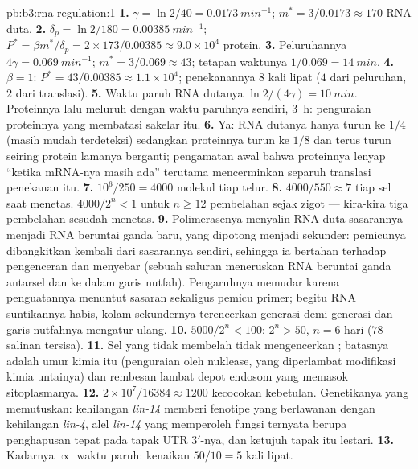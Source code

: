 \begin{solution}{pb:b3:rna-regulation:1}
\textbf{1.} $\gamma = \ln 2/40 = \qty{0.0173}{min^{-1}}$; $m^{*} =
3/0.0173 \approx 170$ RNA duta.
\textbf{2.} $\delta_{p} = \ln 2/180 = \qty{0.00385}{min^{-1}}$; $P^{*} =
\beta m^{*}/\delta_{p} = 2\times 173/0.00385 \approx 9.0\times 10^{4}$
protein.
\textbf{3.} Peluruhannya $4\gamma = \qty{0.069}{min^{-1}}$; $m^{*} = 3/0.069
\approx 43$; tetapan waktunya $1/0.069 = \qty{14}{min}$.
\textbf{4.} $\beta = 1$: $P^{*} = 43/0.00385 \approx 1.1\times 10^{4}$;
penekanannya $8$ kali lipat ($4$ dari peluruhan, $2$ dari translasi).
\textbf{5.} Waktu paruh RNA dutanya $\ln 2/(4\gamma) = \qty{10}{min}$.
Proteinnya lalu meluruh dengan waktu paruhnya sendiri, \qty{3}{h}: penguraian
proteinnya yang membatasi sakelar itu.
\textbf{6.} Ya: RNA dutanya hanya turun ke $1/4$ (masih mudah
terdeteksi) sedangkan proteinnya turun ke $1/8$ dan terus turun seiring
protein lamanya berganti; pengamatan awal bahwa proteinnya lenyap ``ketika
mRNA-nya masih ada'' terutama mencerminkan separuh translasi penekanan itu.
\textbf{7.} $10^{6}/250 = 4000$ molekul tiap telur.
\textbf{8.} $4000/550 \approx 7$ tiap sel saat menetas. $4000/2^{n} < 1$
untuk $n \ge 12$ pembelahan sejak zigot --- kira-kira tiga pembelahan
sesudah menetas.
\textbf{9.} Polimerasenya menyalin RNA duta sasarannya menjadi RNA
beruntai ganda baru, yang dipotong menjadi  sekunder: pemicunya
dibangkitkan kembali dari sasarannya sendiri, sehingga ia bertahan terhadap
pengenceran dan menyebar (sebuah saluran meneruskan RNA beruntai ganda
antarsel dan ke dalam garis nutfah). Pengaruhnya memudar karena penguatannya
menuntut sasaran sekaligus pemicu primer; begitu RNA suntikannya habis,
kolam sekundernya terencerkan generasi demi generasi dan garis nutfahnya
mengatur ulang.
\textbf{10.} $5000/2^{n} < 100$: $2^{n} > 50$, $n = 6$ hari ($78$
salinan tersisa).
\textbf{11.} Sel yang tidak membelah tidak mengencerkan ; batasnya
adalah umur kimia  itu (penguraian oleh nuklease, yang diperlambat
modifikasi kimia untainya) dan rembesan lambat depot endosom yang memasok
sitoplasmanya.
\textbf{12.} $2\times 10^{7}/\num{16384} \approx \num{1200}$ kecocokan
kebetulan. Genetikanya yang memutuskan: kehilangan \emph{lin-14} memberi
fenotipe yang berlawanan dengan kehilangan \emph{lin-4}, alel
\emph{lin-14} yang memperoleh fungsi ternyata berupa penghapusan tepat pada
tapak UTR 3$'$-nya, dan ketujuh tapak itu lestari.
\textbf{13.} Kadarnya $\propto$ waktu paruh: kenaikan $50/10 = 5$ kali lipat.

\end{solution}
